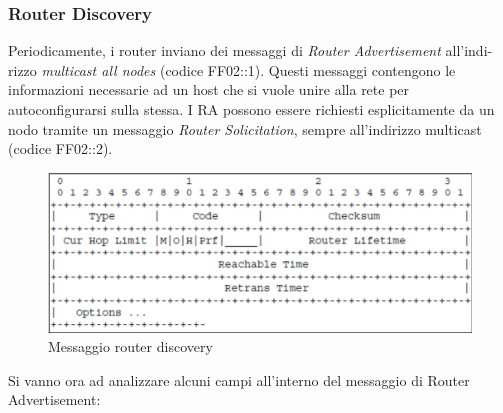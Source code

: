 \documentclass{article}
\begin{document}
\subsubsection{Router Discovery}
Periodicamente, i router inviano dei messaggi di \textit{Router Advertisement} all'indi-\\rizzo \textit{multicast all nodes} (codice FF02::1). Questi messaggi contengono le informazioni necessarie ad un host che si vuole unire alla rete per autoconfigurarsi sulla stessa. I RA possono essere richiesti esplicitamente da un nodo tramite un messaggio \textit{Router Solicitation}, sempre all'indirizzo multicast (codice FF02::2).
\begin{figure}[H]
\centering
\includegraphics[scale=0.3]{figures/router discovery.png}
\caption{Messaggio router discovery}
\end{figure}
Si vanno ora ad analizzare alcuni campi all'interno del messaggio di Router Advertisement:
\end{document}
